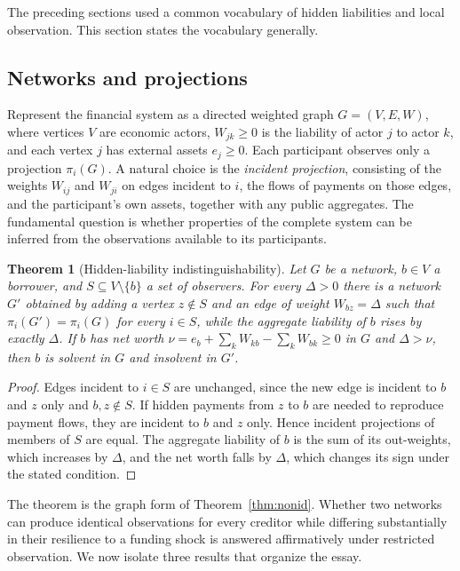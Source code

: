 \documentclass[11pt]{article}
\newtheorem{theorem}{Theorem}[section]
\theoremstyle{definition}
\theoremstyle{remark}
\begin{document}
The preceding sections used a common vocabulary of hidden liabilities and local observation. This section states the vocabulary generally.

\subsection{Networks and projections}

Represent the financial system as a directed weighted graph $G=(V,E,W)$, where vertices $V$ are economic actors, $W_{jk}\ge 0$ is the liability of actor $j$ to actor $k$, and each vertex $j$ has external assets $e_j\ge 0$. Each participant observes only a projection $\pi_i(G)$. A natural choice is the \emph{incident projection}, consisting of the weights $W_{ij}$ and $W_{ji}$ on edges incident to $i$, the flows of payments on those edges, and the participant's own assets, together with any public aggregates. The fundamental question is whether properties of the complete system can be inferred from the observations available to its participants.

\begin{theorem}[Hidden-liability indistinguishability]\label{thm:hidden}
Let $G$ be a network, $b\in V$ a borrower, and $S\subseteq V\setminus\{b\}$ a set of observers. For every $\Delta>0$ there is a network $G'$ obtained by adding a vertex $z\notin S$ and an edge of weight $W_{bz}=\Delta$ such that $\pi_i(G')=\pi_i(G)$ for every $i\in S$, while the aggregate liability of $b$ rises by exactly $\Delta$. If $b$ has net worth $\nu=e_b+\sum_kW_{kb}-\sum_kW_{bk}\ge 0$ in $G$ and $\Delta>\nu$, then $b$ is solvent in $G$ and insolvent in $G'$.
\end{theorem}

\begin{proof}
Edges incident to $i\in S$ are unchanged, since the new edge is incident to $b$ and $z$ only and $b,z\notin S$. If hidden payments from $z$ to $b$ are needed to reproduce payment flows, they are incident to $b$ and $z$ only. Hence incident projections of members of $S$ are equal. The aggregate liability of $b$ is the sum of its out-weights, which increases by $\Delta$, and the net worth falls by $\Delta$, which changes its sign under the stated condition.
\end{proof}

The theorem is the graph form of Theorem~\ref{thm:nonid}. Whether two networks can produce identical observations for every creditor while differing substantially in their resilience to a funding shock is answered affirmatively under restricted observation. We now isolate three results that organize the essay.
\end{document}

